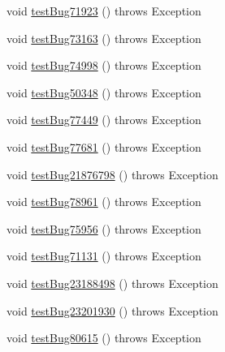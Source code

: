 \begin{DoxyCompactItemize}
void \mbox{\hyperlink{classtestsuite_1_1regression_1_1_statement_regression_test_a3676f906ace9714006ad7a71ab1e4211}{test\+Bug71923}} ()  throws Exception 
\item 
void \mbox{\hyperlink{classtestsuite_1_1regression_1_1_statement_regression_test_ae5f07756a16c505fbd7fb497fcf9f601}{test\+Bug73163}} ()  throws Exception 
\item 
void \mbox{\hyperlink{classtestsuite_1_1regression_1_1_statement_regression_test_a785d6999de84a7868d85817387113884}{test\+Bug74998}} ()  throws Exception 
\item 
void \mbox{\hyperlink{classtestsuite_1_1regression_1_1_statement_regression_test_a2b6b5d2943bee507e1d7495e883ae9c5}{test\+Bug50348}} ()  throws Exception 
\item 
void \mbox{\hyperlink{classtestsuite_1_1regression_1_1_statement_regression_test_a07a77723b5e6ea623ee8d6c78d7786af}{test\+Bug77449}} ()  throws Exception 
\item 
void \mbox{\hyperlink{classtestsuite_1_1regression_1_1_statement_regression_test_adc52d5ddc30d4e6b82fb24fd1c544d26}{test\+Bug77681}} ()  throws Exception 
\item 
void \mbox{\hyperlink{classtestsuite_1_1regression_1_1_statement_regression_test_a7c2127e901386b163bff95c5a884f307}{test\+Bug21876798}} ()  throws Exception 
\item 
void \mbox{\hyperlink{classtestsuite_1_1regression_1_1_statement_regression_test_a0813e2cf77078b1f8476ef827c5c9046}{test\+Bug78961}} ()  throws Exception 
\item 
void \mbox{\hyperlink{classtestsuite_1_1regression_1_1_statement_regression_test_ac552681461db44411308a9164a16e391}{test\+Bug75956}} ()  throws Exception 
\item 
void \mbox{\hyperlink{classtestsuite_1_1regression_1_1_statement_regression_test_a1e38b360b51a8f9704cef9040eb6a44d}{test\+Bug71131}} ()  throws Exception 
\item 
void \mbox{\hyperlink{classtestsuite_1_1regression_1_1_statement_regression_test_ad2c60d7105fb694d073cddbd8e1cdd48}{test\+Bug23188498}} ()  throws Exception 
\item 
void \mbox{\hyperlink{classtestsuite_1_1regression_1_1_statement_regression_test_a3d0ac2b92441d18279f454eff53dff23}{test\+Bug23201930}} ()  throws Exception 
\item 
void \mbox{\hyperlink{classtestsuite_1_1regression_1_1_statement_regression_test_a338c926f02a641b1cabb27021e7e06e4}{test\+Bug80615}} ()  throws Exception 
\item 

\end{DoxyCompactItemize}

